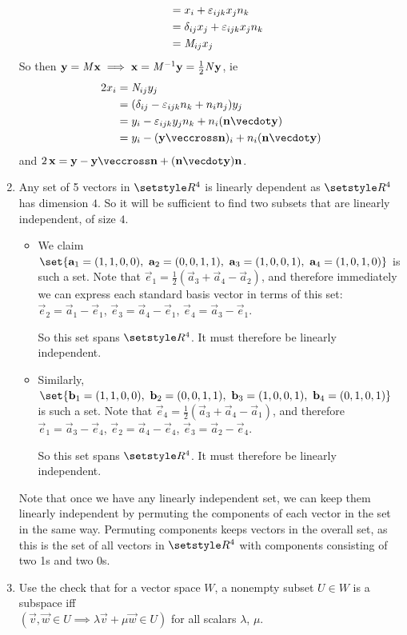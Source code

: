 \documentclass[fleqn,a4paper,11pt]{article}
\begin{document}
\begin{enumerate}[label=\textbf{\arabic*.}]
\begin{alignat*}
    &&           &= x_i + \epsilon_{ijk} x_j n_k \\
    &&           &= \delta_{ij} x_j + \epsilon_{ijk} x_j n_k \\
    &&           &= \mat M_{ij} x_j
   \end{alignat*}
   So then \(\mathrm{\mathbf{y}} = \mathit{M} \mathrm{\mathbf{x}} \implies
    \mathrm{\mathbf{x}} = \mathit{M}^{-1} \mathrm{\mathbf{y}} = \frac 12 \mathit{N} \mathrm{\mathbf{y}}\), ie
   \begin{align*}
    2 x_i &= \mat N_{ij} y_j \\
          &= (\delta_{ij} - \epsilon_{ijk} n_k + n_i n_j) y_j \\
          &= y_i - \epsilon_{ijk} y_j n_k + n_i(\vec n \vecdot \vec y) \\
          &= y_i - (\vec y \veccross \vec n)_i + n_i(\vec n \vecdot \vec y)
   \end{align*}
   and
   \(2\,\vec x
     = \vec y - \vec y \veccross \vec n + (\vec n \vecdot \vec y) \vec n\).
   \item
    Any set of 5 vectors in \(\Reals^4\) is linearly dependent as
    \(\Reals^4\) has dimension \(4\). So it will be sufficient to find two
    subsets that are linearly independent, of size \(4\).
    \begin{itemize}
     \item
      We claim
      \(\set{\vec a_1 = (1, 1, 0, 0),\ \vec a_2 = (0, 0, 1, 1),
           \ \vec a_3 = (1, 0, 0, 1),\ \vec a_4 = (1, 0, 1, 0)}\)
      is such a set. Note that
      \(\vec e_1 = \frac 12 (\vec a_3 + \vec a_4 - \vec a_2)\), and therefore
      immediately we can express each standard basis vector in terms of this
      set:
      \(\vec e_2 = \vec a_1 - \vec e_1\),
      \(\vec e_3 = \vec a_4 - \vec e_1\),
      \(\vec e_4 = \vec a_3 - \vec e_1\).

      So this set spans \(\Reals^4\). It must therefore be linearly independent.
     \item
      Similarly,
      \(\set{\vec b_1 = (1, 1, 0, 0),\ \vec b_2 = (0, 0, 1, 1),
           \ \vec b_3 = (1, 0, 0, 1),\ \vec b_4 = (0, 1, 0, 1)}\)
      is such a set. Note that
      \(\vec e_4 = \frac 12 (\vec a_3 + \vec a_4 - \vec a_1)\), and therefore
      \(\vec e_1 = \vec a_3 - \vec e_4\),
      \(\vec e_2 = \vec a_4 - \vec e_4\),
      \(\vec e_3 = \vec a_2 - \vec e_4\).

      So this set spans \(\Reals^4\). It must therefore be linearly independent.
    \end{itemize}
    Note that once we have any linearly independent set, we can keep them
    linearly independent by permuting the components of each vector in the set
    in the same way. Permuting components keeps vectors in the overall set, as
    this is the set of all vectors in \(\Reals^4\) with components consisting of
    two 1s and two 0s.
   \item
    Use the check that for a vector space \(W\), a nonempty subset \(U \in W\)
    is a subspace iff
    \\ \((\vec v, \vec w \in U \implies \lambda \vec v + \mu \vec w \in U)\) for
    all scalars \(\lambda\), \(\mu\).


\end{enumerate}
\end{document}
